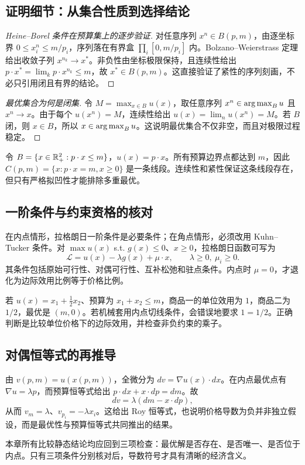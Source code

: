 \subsection{证明细节：从集合性质到选择结论}

\begin{proof}[Heine--Borel 条件在预算集上的逐步验证]
对任意序列 $x^n\in B(p,m)$，由逐坐标界 $0\le x_i^n\le m/p_i$，序列落在有界盒 $\prod_i[0,m/p_i]$ 内。Bolzano--Weierstrass 定理给出收敛子列 $x^{n_k}\to x^*$。非负性由坐标极限保持，且连续性给出
$p\cdot x^*=\lim_k p\cdot x^{n_k}\le m$，故 $x^*\in B(p,m)$。这直接验证了紧性的序列刻画，不必只引用闭且有界的结论。
\end{proof}

\begin{proof}[最优集合为何是闭集]
令 $M=\max_{x\in B}u(x)$，取任意序列 $x^n\in\operatorname*{arg\,max}_Bu$ 且 $x^n\to x$。由于每个 $u(x^n)=M$，连续性给出 $u(x)=\lim_nu(x^n)=M$。若 $B$ 闭，则 $x\in B$，所以 $x\in\operatorname*{arg\,max}_Bu$。这说明最优集合不仅非空，而且对极限过程稳定。
\end{proof}

\begin{example}[最优集合不必是单点]
令 $B=\{x\in\mathbb{R}_+^2:p\cdot x\le m\}$，$u(x)=p\cdot x$。所有预算边界点都达到 $m$，因此 $C(p,m)=\{x:p\cdot x=m,x\ge0\}$ 是一条线段。连续性和紧性保证这条线段存在，但只有严格拟凹性才能排除多重最优。
\end{example}

\subsection{一阶条件与约束资格的核对}
在内点情形，拉格朗日一阶条件是必要条件；在角点情形，必须改用 Kuhn--Tucker 条件。对
$\max u(x)$ s.t. $g(x)\le0$、$x\ge0$，拉格朗日函数可写为
\[
\mathcal L=u(x)-\lambda g(x)+\mu\cdot x,
\qquad \lambda\ge0,\ \mu_i\ge0.
\]
其条件包括原始可行性、对偶可行性、互补松弛和驻点条件。内点时 $\mu=0$，才退化为边际效用比例等于价格比例。

\begin{example}[角点与内点的区别]
若 $u(x)=x_1+\frac12x_2$、预算为 $x_1+x_2\le m$，商品一的单位效用为 $1$，商品二为 $1/2$，最优是 $(m,0)$。若机械套用内点切线条件，会错误地要求 $1=1/2$。正确判断是比较单位价格下的边际效用，并检查非负约束的乘子。
\end{example}

\subsection{对偶恒等式的再推导}
由 $v(p,m)=u(x(p,m))$，全微分为
$dv=\nabla u(x)\cdot dx$。在内点最优点有 $\nabla u=\lambda p$，而预算恒等式给出
$p\cdot dx+x\cdot dp=dm$。故
\[
dv=\lambda(dm-x\cdot dp),
\]
从而 $v_m=\lambda$、$v_{p_i}=-\lambda x_i$。这给出 Roy 恒等式，也说明价格导数为负并非独立假设，而是最优性与预算恒等式共同推出的结果。

\begin{remark}
本章所有比较静态结论均应回到三项检查：最优解是否存在、是否唯一、是否位于内点。只有三项条件分别核对后，导数符号才具有清晰的经济含义。
\end{remark}
